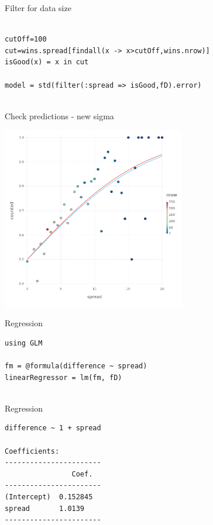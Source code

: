 \documentclass{beamer}
\begin{document}
\begin{frame}[fragile]{Filter for data size}
  \begin{lstlisting}

cutOff=100
cut=wins.spread[findall(x -> x>cutOff,wins.nrow)]
isGood(x) = x in cut

model = std(filter(:spread => isGood,fD).error)
    
\end{lstlisting}
\end{frame}


\begin{frame}{Check predictions - new sigma}
  \begin{center}
    \includegraphics[width=8cm]{predictionGood.png}
\end{center}
  \end{frame}

\begin{frame}[fragile]{Regression}
  \begin{lstlisting}
using GLM
    
fm = @formula(difference ~ spread)
linearRegressor = lm(fm, fD)
    
\end{lstlisting}
\end{frame}

\begin{frame}[fragile]{Regression}
  \begin{verbatim}
difference ~ 1 + spread

Coefficients:
-----------------------
                Coef.  
-----------------------
(Intercept)  0.152845  
spread       1.0139    
-----------------------
\end{verbatim}
 \end{frame}
\end{document}
